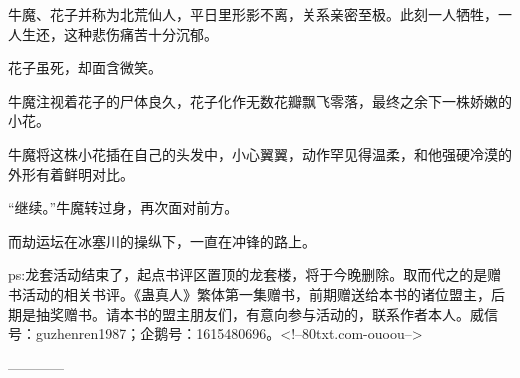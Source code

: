 \begin{this_body}
牛魔、花子并称为北荒仙人，平日里形影不离，关系亲密至极。此刻一人牺牲，一人生还，这种悲伤痛苦十分沉郁。

花子虽死，却面含微笑。

牛魔注视着花子的尸体良久，花子化作无数花瓣飘飞零落，最终之余下一株娇嫩的小花。

牛魔将这株小花插在自己的头发中，小心翼翼，动作罕见得温柔，和他强硬冷漠的外形有着鲜明对比。

“继续。”牛魔转过身，再次面对前方。

而劫运坛在冰塞川的操纵下，一直在冲锋的路上。

ps:龙套活动结束了，起点书评区置顶的龙套楼，将于今晚删除。取而代之的是赠书活动的相关书评。《蛊真人》繁体第一集赠书，前期赠送给本书的诸位盟主，后期是抽奖赠书。请本书的盟主朋友们，有意向参与活动的，联系作者本人。威信号：guzhenren1987；企鹅号：1615480696。<!--80txt.com-ouoou-->

------------

\end{this_body}

